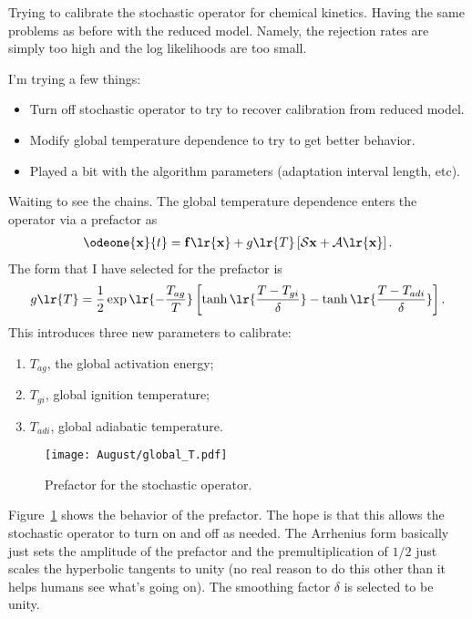 
Trying to calibrate the stochastic operator for chemical kinetics.
Having the same problems as before with the reduced model.  Namely,
the rejection rates are simply too high and the log likelihoods are
too small.

I'm trying a few things:
\begin{itemize}
  \item Turn off stochastic operator to try to recover calibration from
        reduced model.
  \item Modify global temperature dependence to try to get better
        behavior.
  \item Played a bit with the algorithm parameters (adaptation interval
        length, etc).
\end{itemize}

Waiting to see the chains.  The global temperature dependence enters the
operator via a prefactor as
\begin{align}
  \odeone{\mathbf{x}}{t} = \mathbf{f}\lr{\mathbf{x}} + 
      g\lr{T}\left[\mathcal{S}\mathbf{x} + \mathcal{A}\lr{\mathbf{x}}\right].
\end{align}
The form that I have selected for the prefactor is
\begin{align}
  g\lr{T} = \frac{1}{2}\exp\lr{-\frac{T_{ag}}{T}}
    \left[\tanh\lr{\frac{T - T_{gi}}{\delta}} - \tanh\lr{\frac{T - T_{adi}}{\delta}}\right].
\end{align}
This introduces three new parameters to calibrate:
\begin{enumerate}
  \item $T_{ag}$, the global activation energy;
  \item $T_{gi}$, global ignition temperature;
  \item $T_{adi}$, global adiabatic temperature.
\end{enumerate}
\begin{figure}[ht!]
  \texttt{[image: August/global\_T.pdf]}
  \caption{Prefactor for the stochastic operator.}
  \label{fig:gofT}
\end{figure}
Figure~\ref{fig:gofT} shows the behavior of the prefactor.  The hope is that this
allows the stochastic operator to turn on and off as needed.  The Arrhenius form
basically just sets the amplitude of the prefactor and the premultiplication of 
$1/2$ just scales the hyperbolic tangents to unity (no real reason to do this
other than it helps humans see what's going on).  The smoothing factor
$\delta$ is selected to be unity.
